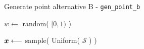 \begin{algorithm}
\caption{Generate point alternative B - \texttt{gen\_point\_b}}\label{algo:gen-b}
\vspace{8pt}
\nosemic
\SetAlgoLined
{}

$w \longleftarrow $ random( $[0,1)$ ) \;

{
    $\boldsymbol{x} \longleftarrow $ sample( Uniform( $\mathcal{S}$ ) ) \;
} 


\end{algorithm}


%



 
